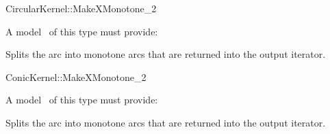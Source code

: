 \begin{ccRefConcept}{CircularKernel::MakeXMonotone_2}

\ccDefinition


A model \ccVar\ of this type must provide:

{Splits the arc  into monotone arcs that are returned into the 
output iterator.}

\ccHasModels


\ccSeeAlso


\end{ccRefConcept}
\begin{ccRefConcept}{ConicKernel::MakeXMonotone_2}

\ccDefinition


A model \ccVar\ of this type must provide:

{Splits the arc  into monotone arcs that are returned into the 
output iterator.}

\ccHasModels


\ccSeeAlso


\end{ccRefConcept}

